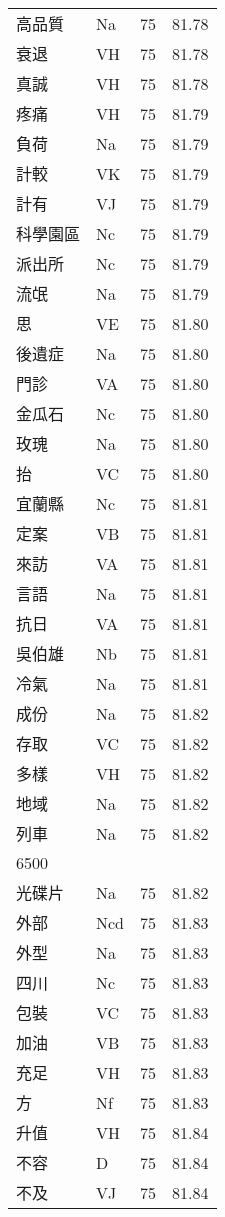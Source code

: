\documentclass[twocolumn]{book}
\begin{document}
\begin{supertabular}{llrr}
高品質 & Na & 75 &  81.78\\
衰退 & VH & 75 &  81.78\\
真誠 & VH & 75 &  81.78\\
疼痛 & VH & 75 &  81.79\\
負荷 & Na & 75 &  81.79\\
計較 & VK & 75 &  81.79\\
計有 & VJ & 75 &  81.79\\
科學園區 & Nc & 75 &  81.79\\
派出所 & Nc & 75 &  81.79\\
流氓 & Na & 75 &  81.79\\
思 & VE & 75 &  81.80\\
後遺症 & Na & 75 &  81.80\\
門診 & VA & 75 &  81.80\\
金瓜石 & Nc & 75 &  81.80\\
玫瑰 & Na & 75 &  81.80\\
抬 & VC & 75 &  81.80\\
宜蘭縣 & Nc & 75 &  81.81\\
定案 & VB & 75 &  81.81\\
來訪 & VA & 75 &  81.81\\
言語 & Na & 75 &  81.81\\
抗日 & VA & 75 &  81.81\\
吳伯雄 & Nb & 75 &  81.81\\
冷氣 & Na & 75 &  81.81\\
成份 & Na & 75 &  81.82\\
存取 & VC & 75 &  81.82\\
多樣 & VH & 75 &  81.82\\
地域 & Na & 75 &  81.82\\
列車 & Na & 75 &  81.82\\
6500\\
光碟片 & Na & 75 &  81.82\\
外部 & Ncd & 75 &  81.83\\
外型 & Na & 75 &  81.83\\
四川 & Nc & 75 &  81.83\\
包裝 & VC & 75 &  81.83\\
加油 & VB & 75 &  81.83\\
充足 & VH & 75 &  81.83\\
方 & Nf & 75 &  81.83\\
升值 & VH & 75 &  81.84\\
不容 & D & 75 &  81.84\\
不及 & VJ & 75 &  81.84\\

\end{supertabular}
\end{document}
